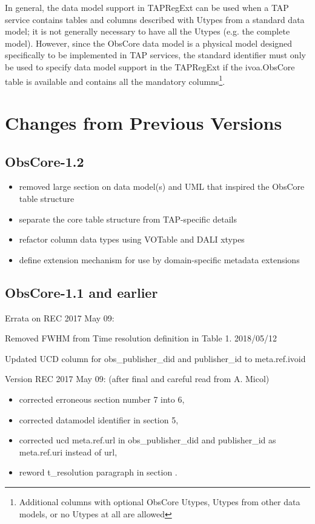 \documentclass[11pt,a4paper]{ivoa}
\begin{document}
In general, the data model support in TAPRegExt can be used when a TAP service contains tables and columns described
with Utypes from a standard data model; it is not generally necessary to have all the Utypes (e.g. the complete model).
However, since the ObsCore data model is a physical model designed specifically to be implemented in TAP services, the
standard identifier must only be used to specify data model support in the TAPRegExt if the ivoa.ObsCore table is
available and contains all the mandatory columns\footnote{ Additional columns with optional ObsCore Utypes, Utypes from
other data models, or no Utypes at all are allowed}.


\section{Changes from Previous Versions}
\subsection{ObsCore-1.2}
\begin{itemize}
\item removed large section on data model(s) and UML that inspired the ObsCore table structure
\item separate the core table structure from TAP-specific details
\item refactor column data types using VOTable and DALI xtypes
\item define extension mechanism for use by domain-specific metadata extensions
\end{itemize}

\subsection{ObsCore-1.1 and earlier}

Errata on REC 2017 May 09:

Removed FWHM from Time resolution definition in Table 1. 2018/05/12

Updated UCD column for obs\_publisher\_did and publisher\_id to meta.ref.ivoid

Version REC 2017 May 09: (after final and careful read from A. Micol)

\begin{itemize}
\item corrected erroneous section number 7 into 6,
\item corrected  datamodel identifier in section 5,
\item corrected ucd meta.ref.url in obs\_publisher\_did and publisher\_id  as meta.ref.uri instead of url,
\item reword t\_resolution paragraph in section .
\end{itemize}
\end{document}
